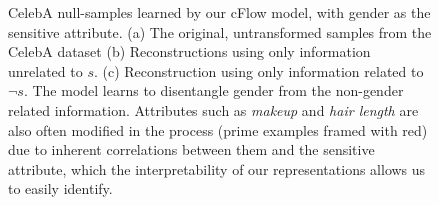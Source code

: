 \begin{figure}[tb]
{      %
      \label{fig:cflow_celeba_recon_s_suppmat}
  }
  \caption{
    CelebA null-samples learned by our cFlow model, with gender as the sensitive attribute.
    (a) The original, untransformed samples from the CelebA dataset
    (b) Reconstructions using only information unrelated to $s$.
    (c) Reconstruction using only information related to $\neg s$.
    The model learns to disentangle gender from the non-gender related information.
    Attributes such as \emph{makeup} and \emph{hair length} are also often modified in the process (prime examples framed with red) due to inherent correlations between them and the sensitive attribute, which the interpretability of our representations allows us to easily identify.
  }\label{fig:celeba_cflow_suppmat}
\end{figure}

